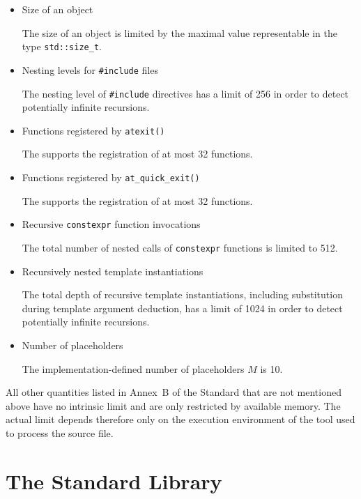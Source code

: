 \begin{itemize}

\item Size of an object 

The size of an object is limited by the maximal value representable in the type \texttt{std::size\_t}.

\item Nesting levels for \texttt{\#include} files 

The nesting level of \texttt{\#include} directives has a limit of 256 in order to detect potentially infinite recursions.

\item Functions registered by \texttt{atexit()} 

The \ecs{} supports the registration of at most 32 functions.

\item Functions registered by \texttt{at_quick_exit()} 

The \ecs{} supports the registration of at most 32 functions.

\item Recursive \texttt{constexpr} function invocations 

The total number of nested calls of \texttt{constexpr} functions is limited to 512.

\item Recursively nested template instantiations 

The total depth of recursive template instantiations, including substitution during template argument deduction, has a limit of 1024 in order to detect potentially infinite recursions.

\item Number of placeholders 

The implementation-defined number of placeholders $M$ is 10.

\end{itemize}

All other quantities listed in Annex~B of the \cpp{} Standard that are not mentioned above have no intrinsic limit and are only restricted by available memory.
The actual limit depends therefore only on the execution environment of the tool used to process the \cpp{} source file.

\section{The Standard \cpp{} Library}

